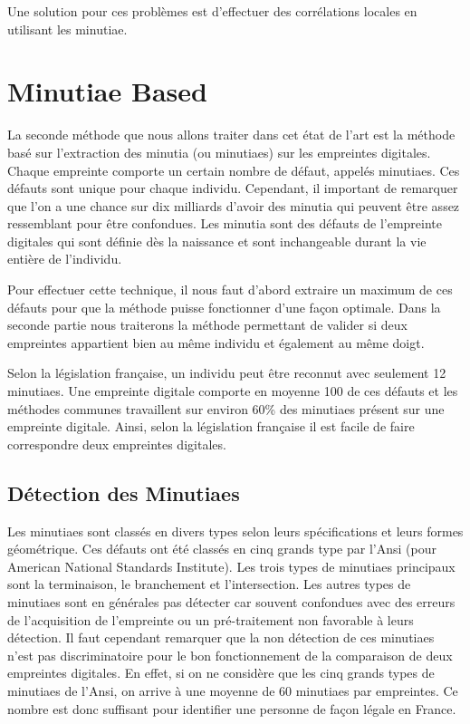 \documentclass{report}
\begin{document}
Une solution pour ces problèmes est d'effectuer des corrélations locales en utilisant les minutiae.

\chapter{Minutiae Based}

La seconde méthode que nous allons traiter dans cet état de l'art est
la méthode basé sur l'extraction des minutia (ou minutiaes) sur les
empreintes digitales. Chaque empreinte comporte un certain nombre de
défaut, appelés minutiaes. Ces défauts sont unique pour chaque
individu. Cependant, il important de remarquer que l'on a une chance
sur dix milliards d'avoir des minutia qui peuvent être assez
ressemblant pour être confondues. Les minutia sont des défauts de
l'empreinte digitales qui sont définie dès la naissance et sont
inchangeable durant la vie entière de l'individu.

Pour effectuer cette technique, il nous faut d'abord extraire un
maximum de ces défauts pour que la méthode puisse fonctionner d'une
façon optimale. Dans la seconde partie nous traiterons la méthode
permettant de valider si deux empreintes appartient bien au même
individu et également au même doigt.

Selon la législation française, un individu peut être reconnut avec
seulement 12 minutiaes. Une empreinte digitale comporte en moyenne 100
de ces défauts et les méthodes communes travaillent sur environ 60\%
des minutiaes présent sur une empreinte digitale. Ainsi, selon la
législation française il est facile de faire correspondre deux
empreintes digitales.


\section{Détection des Minutiaes}

Les minutiaes sont classés en divers types selon leurs spécifications
et leurs formes géométrique. Ces défauts ont été classés en cinq
grands type par l'Ansi (pour American National Standards
Institute). Les trois types de minutiaes principaux sont la
terminaison, le branchement et l'intersection. Les autres types de
minutiaes sont en générales pas détecter car souvent confondues avec
des erreurs de l'acquisition de l'empreinte ou un pré-traitement non
favorable à leurs détection. Il faut cependant remarquer que la non
détection de ces minutiaes n'est pas discriminatoire pour le bon
fonctionnement de la comparaison de deux empreintes digitales. En
effet, si on ne considère que les cinq grands types de minutiaes de
l'Ansi, on arrive à une moyenne de 60 minutiaes par empreintes. Ce
nombre est donc suffisant pour identifier une personne de façon légale
en France.
\end{document}

